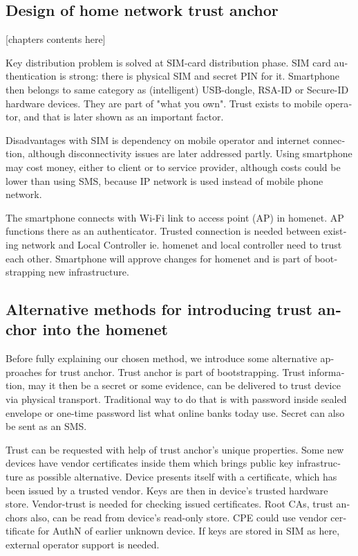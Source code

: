 \documentclass[12pt,a4paper,english]{tutthesis}
\begin{document}
\begin{otherlanguage}{english}
\chapter{Design of home network trust anchor}
\label{sec-4}




[chapters contents here]

Key distribution problem is solved at SIM-card distribution phase.
SIM card authentication is strong: there is physical SIM and secret PIN for it.
Smartphone then belongs to same category as (intelligent) USB-dongle,
RSA-ID or Secure-ID hardware devices.  They are part of "what you own".
Trust exists to mobile operator, and that is later shown as an
important factor. 



Disadvantages with SIM is dependency on mobile operator and internet
connection, although disconnectivity issues are later addressed partly.
Using smartphone may cost money, either to client or to service
provider, although costs could be lower than using SMS, because 
IP network is used instead of mobile
phone network.


The smartphone connects
 with Wi-Fi link to access point (AP) in homenet.
 AP functions there as an authenticator.
Trusted connection is needed between existing network and Local
Controller ie. homenet and local controller need to trust each other.
Smartphone will approve changes for homenet and is part of bootstrapping
new infrastructure.

\section{Alternative methods for introducing trust anchor into the homenet}
\label{sec-4-1}

Before fully explaining our chosen method, we introduce some
alternative approaches for trust anchor. Trust anchor is part of
bootstrapping. Trust information, may it then be a secret or some
evidence, can be delivered to trust device via physical
transport. Traditional way to do that is with password inside sealed
envelope or one-time password list what online banks today use. Secret
can also be sent as an SMS.

Trust can be requested with help of trust anchor's unique
 properties. Some new devices have vendor certificates inside them which
brings public key infrastructure as possible alternative. Device
presents itself with a certificate, which has been issued by a trusted
vendor.  Keys are then in device's trusted hardware store.
Vendor-trust is needed for checking issued certificates. Root CAs, 
trust anchors also, can be read from device's read-only store. 
CPE could use vendor certificate for AuthN of earlier unknown device.
If keys are stored in SIM as here, external operator support is needed. 



\end{otherlanguage}
\end{document}
